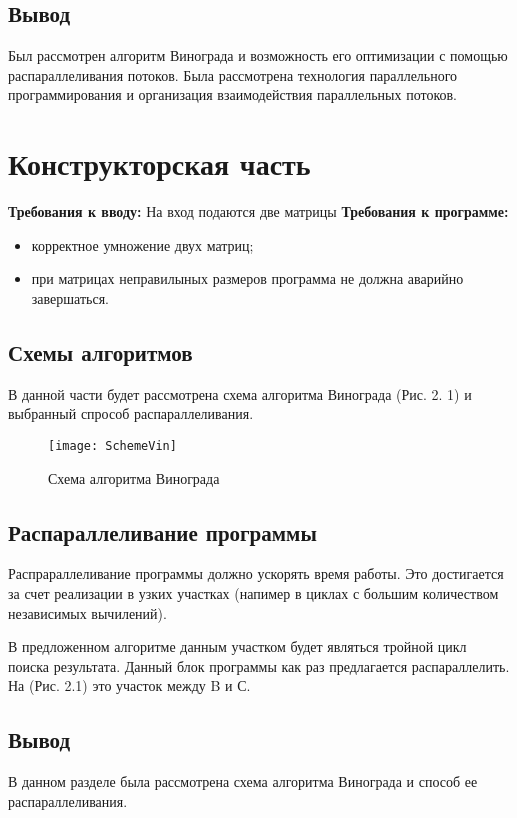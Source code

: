 \documentclass[12pt]{report}
\begin{document}
\section{Вывод}
Был рассмотрен алгоритм Винограда и возможность его оптимизации с помощью распараллеливания потоков. Была рассмотрена технология параллельного программирования и
организация взаимодействия параллельных потоков.



\chapter{Конструкторская часть}
\textbf{Требования к вводу:}
На вход подаются две матрицы
\newline
\textbf{Требования к программе:}
\begin{itemize}
\item корректное умножение двух матриц;
\item при матрицах неправилыных размеров программа не должна аварийно завершаться.
\end{itemize}

\section{Схемы алгоритмов}
В данной части будет рассмотрена схема алгоритма Винограда (Рис. 2. 1) и выбранный спрособ распараллеливания.

\begin{figure}[!htbp]
\centering
\texttt{[image: SchemeVin]}
\caption{Схема алгоритма Винограда}
\label{fig:mpr}
\end{figure}

\newpage

\section{Распараллеливание программы}
Распрараллеливание программы должно ускорять время работы. Это достигается за счет реализации в узких участках (напимер в циклах с большим количеством независимых вычилений).

В предложенном алгоритме данным участком будет являться тройной цикл поиска результата.
Данный блок программы как раз предлагается распараллелить.
На (Рис. 2.1) это участок между B и С. 

\section{Вывод}
В данном разделе была рассмотрена схема алгоритма Винограда и способ ее распараллеливания.
\end{document}
